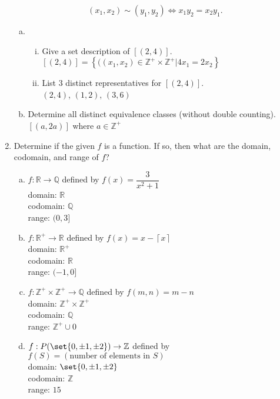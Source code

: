 \documentclass[12pt]{amsart}
\newcommand{\ceil}[1]{\ensuremath{\left\lceil #1\right\rceil}}
\begin{document}
\begin{enumerate}[{\bfseries 1.}]
	$$(x_{1}, x_{2})\sim (y_{1}, y_{2})\Longleftrightarrow x_{1}y_{2}=x_{2}y_{1}.$$

	\begin{enumerate}[(a)]
	\item\begin{enumerate}[(i)]
		\vspace{0.2in}
		\item Give a set description of $[(2,4)]$.
			\\$[(2,4)] =  \left\{((x_{1}, x_{2}) \in\mathbb{Z^{+}\times Z^{+}}| 4x_{1} = 2x_{2}\right\}$
		\vspace{0.1in}
		\item List 3 distinct representatives for $[(2,4)]$.
			\\$(2, 4)$, $(1, 2)$, $(3, 6)$
		\end{enumerate}
	\vspace{0.1in}
	\item Determine all distinct equivalence classes (without double counting).
		\\$[(a, 2a)]$ where $a\in\mathbb{Z^+}$
	\end{enumerate}

\newpage
\item Determine if the given $f$ is a function.  If so, then what are the domain, codomain, and range of $f$?

	\begin{enumerate}[(a)]
	\vspace{0.1in}
	\item $f: \mathbb{R}\to\mathbb{Q}$ defined by $f(x)=\dfrac{3}{x^{2}+1}$
		\\domain: $\mathbb{R}$
		\\codomain: $\mathbb{Q}$
		\\range: $(0, 3]$
	\vspace{0.1in}
	\item $f: \mathbb{R}^{+}\to\mathbb{R}$ defined by $f(x)=x-\ceil{x}$
		\\domain: $\mathbb{R^+}$
		\\codomain: $\mathbb{R}$
		\\range: $(-1, 0]$
	\vspace{0.1in}
	\item $f: \mathbb{Z}^{+}\times\mathbb{Z}^{+}\to\mathbb{Q}$ defined by $f(m,n)=m-n$
		\\domain: $\mathbb{Z^+ \times Z^+}$
		\\codomain: $\mathbb{Q}$
		\\range: $\mathbb{Z^+} \cup 0$
	\vspace{0.1in}
	\item $f: P(\set{0, \pm 1, \pm 2})\to\mathbb{Z}$ defined by $f(S)=(\text{number of elements in }S)$
		\\domain: $\set{0, \pm 1, \pm 2}$
		\\codomain: $\mathbb{Z}$
		\\range: $15$
	\end{enumerate}


\end{enumerate}
\end{document}
